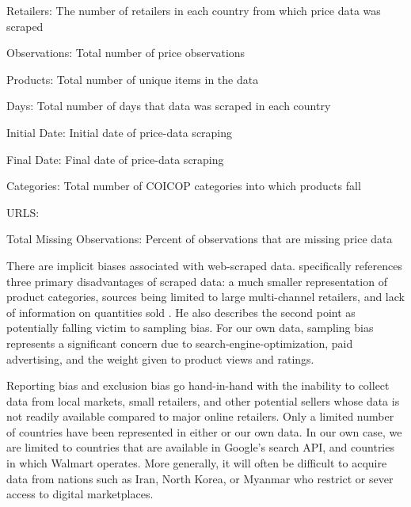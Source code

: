 \begin{table}
{\begin{threeparttable}
    \begin{tablenotes}
      \small
      \item Retailers: The number of retailers in each country from which price data was scraped
      \item Observations: Total number of price observations
      \item Products: Total number of unique items in the data
      \item Days: Total number of days that data was scraped in each country
      \item Initial Date: Initial date of price-data scraping
      \item Final Date: Final date of price-data scraping
      \item Categories: Total number of COICOP categories into which products fall
      \item URLS: 
      \item Total Missing Observations: Percent of observations that are missing price data
    \end{tablenotes}
  \end{threeparttable}
  }
\end{table}
\label{table:cavallo}



There are implicit biases associated with web-scraped data. \citet{Cavallo2015} specifically references three primary disadvantages of scraped data: a much smaller representation of product categories, sources being limited to large multi-channel retailers, and lack of information on quantities sold \citep{Cavallo2015}.  He also describes the second point as potentially falling victim to sampling bias.  For our own data, sampling bias represents a significant concern due to search-engine-optimization, paid advertising, and the weight given to product views and ratings.  

Reporting bias and exclusion bias go hand-in-hand with the inability to collect data from local markets, small retailers, and other potential sellers whose data is not readily available compared to major online retailers. Only a limited number of countries have been represented in either \citet{Cavallo2015} or our own data.  In our own case, we are limited to countries that are available in Google's search API, and countries in which Walmart operates.  More generally, it will often be difficult to acquire data from nations such as Iran, North Korea, or Myanmar who restrict or sever access to digital marketplaces.

